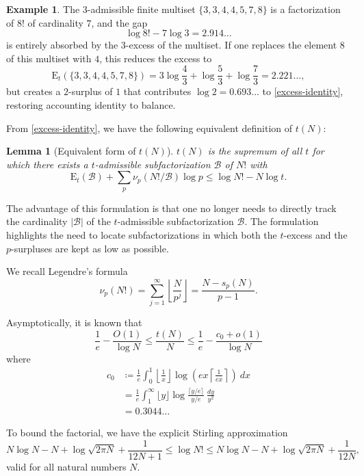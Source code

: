 \documentclass[12pt,a4paper,reqno]{amsart}
\numberwithin{equation}{section}
\theoremstyle{plain}
\newtheorem{lemma}[theorem]{Lemma}
\theoremstyle{definition}
\newtheorem{example}[theorem]{Example}
\newcommand\tuple{{\mathcal B}}
\newcommand\excess{{\mathrm{E}}}
\begin{document}
\begin{example}  The $3$-admissible finite multiset $\{ 3,3,4,4,5,7,8\}$ is a factorization of $8!$ of cardinality $7$, and the gap
$$ \log 8! - 7 \log 3 = 2.914\dots$$
is entirely absorbed by the $3$-excess of the multiset.
If one replaces the element $8$ of this multiset with $4$, this reduces the excess to
$$ \excess_t(\{3,3,4,4,5,7,8\}) = 3 \log \frac{4}{3}  + \log \frac{5}{3} + \log \frac{7}{3} = 2.221\dots,$$
but creates a $2$-surplus of $1$ that contributes $\log 2 = 0.693\dots$ to \eqref{excess-identity}, restoring accounting identity to balance.
\end{example}

From \eqref{excess-identity}, we have the following equivalent definition of $t(N)$:

\begin{lemma}[Equivalent form of $t(N)$]\label{balance} $t(N)$ is the supremum of all $t$ for which there exists a $t$-admissible subfactorization $\tuple$ of $N!$ with
$$  \excess_t(\tuple) + \sum_p \nu_p(N!/\tuple) \log p \leq \log N! - N \log t.$$
\end{lemma}

The advantage of this formulation is that one no longer needs to directly track the cardinality $|\tuple|$ of the $t$-admissible subfactorization $\tuple$.  The formulation  highlights the need to locate subfactorizations in which both the $t$-excess and the $p$-surpluses are kept as low as possible.


We recall Legendre's formula
\begin{equation}\label{legendre}
  \nu_p(N!) = \sum_{j=1}^\infty \left\lfloor \frac{N}{p^j} \right\rfloor = \frac{N - s_p(N)}{p-1}.
\end{equation}

Asymptotically, it is known that
$$ \frac{1}{e} - \frac{O(1)}{\log N} \leq \frac{t(N)}{N} \leq \frac{1}{e} - \frac{c_0+o(1)}{\log N}$$
where
  \begin{align*}
    c_0 &\coloneqq \frac{1}{e} \int_0^1 \left \lfloor \frac{1}{x} \right\rfloor \log \left( ex \left \lceil \frac{1}{ex} \right\rceil \right)\ dx \\
    &= \frac{1}{e} \int_1^\infty \lfloor y \rfloor \log \frac{\lceil y/e \rceil}{y/e}\ \frac{dy}{y^2} \\
    &= 0.3044\dots
  \end{align*}

To bound the factorial, we have the explicit Stirling approximation \cite{robbins}
\begin{equation}\label{stirling}
  N \log N - N + \log \sqrt{2\pi N} + \frac{1}{12N+1} \leq \log N! \leq N \log N - N + \log \sqrt{2\pi N} + \frac{1}{12N},
\end{equation}
valid for all natural numbers $N$. 
\end{document}
